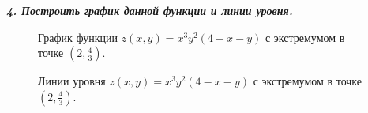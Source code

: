 \documentclass[a5paper, 10pt]{article}
\theoremstyle{definition}
\theoremstyle{plain}
\theoremstyle{remark}
\begin{document}
\newpage
\textit{\textbf{4. Построить график данной функции и линии уровня.}}\\
\begin{figure}[h]
\caption{График функции $z(x,y) = x^3y^2(4-x-y)$ с экстремумом в точке  $  \left(2, \frac{4}{3}\right)$.}
\caption{Линии уровня $z(x,y) = x^3y^2(4-x-y)$ с экстремумом в точке  $  \left(2, \frac{4}{3}\right)$.}
\end{figure}


\newpage
\end{document}
